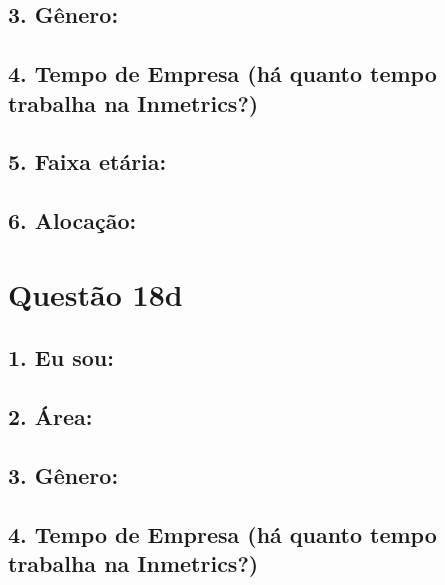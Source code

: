 \documentclass[]{book}
\begin{document}
\hypertarget{genero-42}{%
\subsection{3. Gênero:}\label{genero-42}}

\hypertarget{tempo-de-empresa-ha-quanto-tempo-trabalha-na-inmetrics-42}{%
\subsection{4. Tempo de Empresa (há quanto tempo trabalha na Inmetrics?)}\label{tempo-de-empresa-ha-quanto-tempo-trabalha-na-inmetrics-42}}

\hypertarget{faixa-etaria-42}{%
\subsection{5. Faixa etária:}\label{faixa-etaria-42}}

\hypertarget{alocacao-42}{%
\subsection{6. Alocação:}\label{alocacao-42}}

\hypertarget{questao-18d}{%
\section{Questão 18d}\label{questao-18d}}

\hypertarget{eu-sou-43}{%
\subsection{1. Eu sou:}\label{eu-sou-43}}

\hypertarget{area-43}{%
\subsection{2. Área:}\label{area-43}}

\hypertarget{genero-43}{%
\subsection{3. Gênero:}\label{genero-43}}

\hypertarget{tempo-de-empresa-ha-quanto-tempo-trabalha-na-inmetrics-43}{%
\subsection{4. Tempo de Empresa (há quanto tempo trabalha na Inmetrics?)}\label{tempo-de-empresa-ha-quanto-tempo-trabalha-na-inmetrics-43}}
\end{document}

